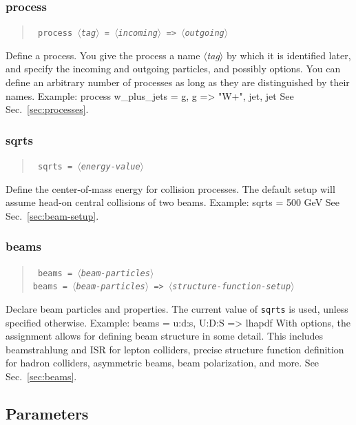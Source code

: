 \documentclass[12pt]{book}
\newenvironment{code}%
  {\begingroup\footnotesize
   \quote
   \verbatim}%
  {\endverbatim
   \endquote
   \endgroup\noindent}
\newenvironment{syntax}%
  {\begin{quote}
   \begin{flushleft}\tt}%
  {\end{flushleft}
   \end{quote}}
\newcommand{\var}[1]{$\langle$\textit{#1}$\rangle$}
\newcommand{\ttt}[1]{\texttt{#1}}
\begin{document}
\subsubsection{process}
\begin{syntax}
process \var{tag} = \var{incoming} \verb|=>| \var{outgoing}
\end{syntax}
Define a process.  You give the process a name \var{tag} by which it is
identified later, and specify the incoming and outgoing particles,
and possibly options.  You can define an arbitrary number of processes
as long as they are distinguished by their names.  Example:
\begin{code}
process w_plus_jets = g, g => "W+", jet, jet
\end{code}
See Sec.~\ref{sec:processes}.


\subsubsection{sqrts}
\begin{syntax}
sqrts = \var{energy-value}
\end{syntax}
Define the center-of-mass energy for collision processes.  The default
setup will assume head-on central collisions of two beams.  Example:
\begin{code}
sqrts = 500 GeV
\end{code}
See Sec.~\ref{sec:beam-setup}.


\subsubsection{beams}
\begin{syntax}
beams = \var{beam-particles} \\
beams = \var{beam-particles} => \var{structure-function-setup}
\end{syntax}
Declare beam particles and properties.  The current value of \ttt{sqrts} is
used, unless specified otherwise.  Example:
\begin{code}
beams = u:d:s, U:D:S => lhapdf
\end{code}
With options, the assignment allows for
defining beam structure in some detail.  This includes beamstrahlung and ISR
for lepton colliders, precise structure function definition for hadron
colliders, asymmetric beams, beam polarization, and more.  See
Sec.~\ref{sec:beams}.


\subsection{Parameters}
\end{document}
